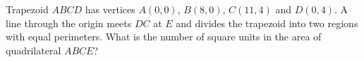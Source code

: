 Trapezoid $ABCD$ has vertices $A(0,0)$, $B(8,0)$, $C(11,4)$ and $D(0,4)$. A line through the origin meets $DC$ at $E$ and divides the trapezoid into two regions with equal perimeters. What is the number of square units in the area of quadrilateral $ABCE$?
